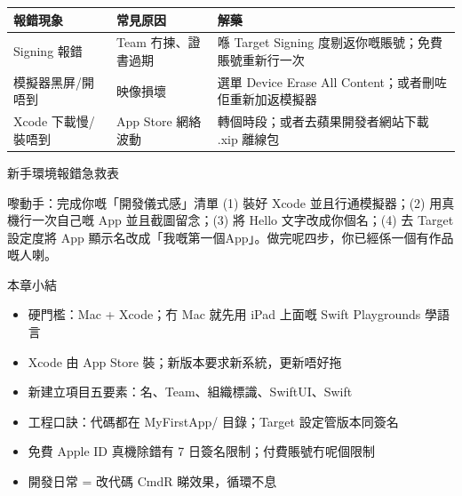 \begin{center}
\begin{tabularx}{\linewidth}{|X|X|X|}
\hline
\textbf{報錯現象} & \textbf{常見原因} & \textbf{解藥} \tabularnewline
\hline
Signing 報錯 & Team 冇揀、證書過期 & 喺 Target Signing 度剔返你嘅賬號；免費賬號重新行一次 \tabularnewline
模擬器黑屏/開唔到 & 映像損壞 & 選單 Device Erase All Content；或者刪咗佢重新加返模擬器 \tabularnewline
Xcode 下載慢/裝唔到 & App Store 網絡波動 & 轉個時段；或者去蘋果開發者網站下載 .xip 離線包 \tabularnewline
\hline
\end{tabularx}
\end{center}

\begin{center}\small\color{gray}新手環境報錯急救表\end{center}

\begin{tcbpractice}{嚟動手：完成你嘅「開發儀式感」清單}
(1) 裝好 Xcode 並且行通模擬器；(2) 用真機行一次自己嘅 App 並且截圖留念；(3) 將 Hello 文字改成你個名；(4) 去 Target 設定度將 App 顯示名改成「我嘅第一個App」。做完呢四步，你已經係一個有作品嘅人喇。

\end{tcbpractice}

\begin{tcbsummary}{本章小結}
\begin{itemize}
  \item 硬門檻：Mac + Xcode；冇 Mac 就先用 iPad 上面嘅 Swift Playgrounds 學語言
  \item Xcode 由 App Store 裝；新版本要求新系統，更新唔好拖
  \item 新建立項目五要素：名、Team、組織標識、SwiftUI、Swift
  \item 工程口訣：代碼都在 MyFirstApp/ 目錄；Target 設定管版本同簽名
  \item 免費 Apple ID 真機除錯有 7 日簽名限制；付費賬號冇呢個限制
  \item 開發日常 = 改代碼 CmdR 睇效果，循環不息
\end{itemize}

\end{tcbsummary}
